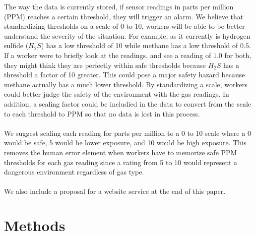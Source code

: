 \documentclass[twoside,twocolumn]{article}
\begin{document}
The way the data is currently stored, if sensor readings in parts per million (PPM) reaches a certain threshold, they will trigger an alarm. We believe that standardizing thresholds on a scale of 0 to 10, workers will be able to be better understand the severity of the situation. For example, as it currently is hydrogen sulfide ($H_2 S$) has a low threshold of 10 while methane has a low threshold of $0.5$. If a worker were to briefly look at the readings, and see a reading of $1.0$ for both, they might think they are perfectly within safe thresholds because $H_2 S$ has a threshold a factor of 10 greater. This could pose a major safety hazard because methane actually has a much lower threshold. By standardizing a scale, workers could better judge the safety of the environment with the gas readings. In addition, a scaling factor could be includied in the data to convert from the scale to each threshold to PPM so that no data is lost in this process.\\\\
We suggest scaling each reading for parts per million to a 0 to 10 scale where a 0 would be safe, 5 would be lower exposure, and 10 would be high exposure. This removes the human error element when workers have to memorize safe PPM thresholds for each gas reading since a rating from 5 to 10 would represent a dangerous environment regardless of gas type.\\\\
We also include a proposal for a website service at the end of this paper.


\section{Methods}
\end{document}
